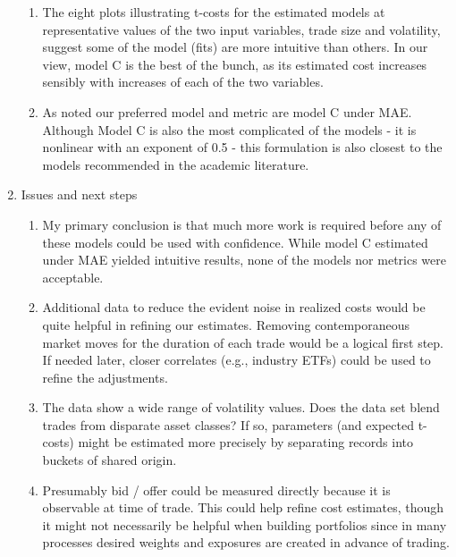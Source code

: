 \documentclass[12pt]{article}
\begin{document}
\begin{enumerate}
\begin{enumerate}
    \item   The eight plots illustrating t-costs for the estimated models at representative values of the two input variables, trade size and volatility, suggest some of the model (fits) are more intuitive than others.   In our view, model C is the best of the bunch, as its estimated cost increases sensibly with increases of each of the two variables. 

    \item As noted our preferred model and metric are model C under MAE.  Although Model C is also the most complicated of the models - it is nonlinear with an exponent of 0.5 - this formulation is also closest to the models recommended in the academic literature. 
\end{enumerate}

\item Issues and next steps
\begin{enumerate}

    \item My primary conclusion is that much more work is required before any of these models could be used with confidence.  While model C estimated under MAE yielded intuitive results, none of the models nor metrics were acceptable.
    
 \item Additional data to reduce the evident noise in realized costs would be quite helpful in refining our estimates. 
 Removing contemporaneous market moves for the duration of each trade would be a logical first step.  If needed later, closer correlates (e.g., industry ETFs) could be used to refine the adjustments. 

 \item The data show a wide range of volatility values.  Does the data set blend trades from disparate asset classes?   If so, parameters (and expected t-costs) might be estimated more precisely by separating records into buckets of shared origin.
 
\item Presumably bid / offer could be measured directly because it is observable at time of trade. This could help refine cost estimates, though it might not necessarily be helpful when building portfolios since in many processes desired weights and exposures are created in advance of trading.

\end{enumerate}
\end{enumerate}
\end{document}
